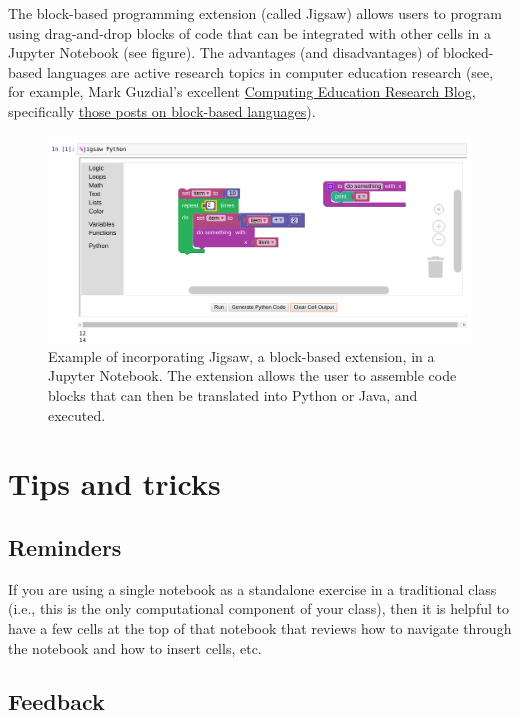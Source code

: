 \documentclass[]{book}
\begin{document}
The block-based programming extension (called Jigsaw) allows users to
program using drag-and-drop blocks of code that can be integrated with
other cells in a Jupyter Notebook (see figure). The advantages (and
disadvantages) of blocked-based languages are active research topics
in computer education research (see, for example, Mark Guzdial's
excellent \href{https://computinged.wordpress.com/}{Computing Education Research Blog},
specifically \href{https://computinged.wordpress.com/tag/blocks-based-language/}{those posts on block-based languages}).

\begin{figure}
\centering
\includegraphics{images/jigsaw.png}
\caption{Example of incorporating Jigsaw, a block-based extension, in a Jupyter Notebook. The extension allows the user to assemble code blocks that can then be translated into Python or Java, and executed.}
\end{figure}

\hypertarget{tips-and-tricks}{%
\section{Tips and tricks}\label{tips-and-tricks}}

\hypertarget{reminders}{%
\subsection{Reminders}\label{reminders}}

If you are using a single notebook as a standalone exercise in a
traditional class (i.e., this is the only computational component of
your class), then it is helpful to have a few cells at the top of that
notebook that reviews how to navigate through the notebook and how to
insert cells, etc.

\hypertarget{feedback}{%
\subsection{Feedback}\label{feedback}}
\end{document}
